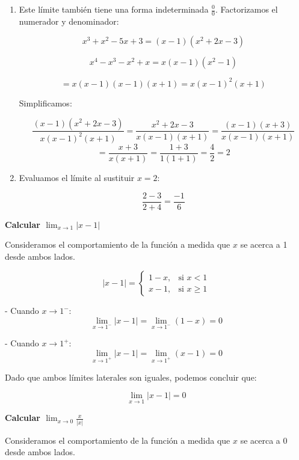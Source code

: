 \documentclass[answers]{exam} %
\begin{document}
\begin{questions}
\begin{solution}
\begin{enumerate}[label=\alph*.]
			\item Este límite también tiene una forma indeterminada \( \frac{0}{0} \). Factorizamos el numerador y denominador:

			      \[
				      x^3 + x^2 - 5x + 3 = (x-1)(x^2 + 2x - 3)
			      \]

			      \[
				      x^4 - x^3 - x^2 + x = x(x-1)(x^2 - 1)
			      \]

			      \[
				      = x(x-1)(x-1)(x+1) = x(x-1)^2(x+1)
			      \]

			      Simplificamos:

			      \[
				      \frac{(x-1)(x^2 + 2x - 3)}{x(x-1)^2(x+1)} = \frac{x^2 + 2x - 3}{x(x-1)(x+1)} = \frac{(x-1)(x+3)}{x(x-1)(x+1)}
			      \]
				  \[
					= \frac{x+3}{x(x+1)} = \frac{1+3}{1(1+1)} = \frac{4}{2} = 2 
				  \]
			\item Evaluamos el límite al sustituir \(x = 2\):

			      \[
				      \frac{2-3}{2+4} = \frac{-1}{6}
			      \]
		\end{enumerate}
		\vspace{1cm}
	\end{solution}


	\vspace{0.5cm}

	\question \large\textbf{Calcular $\displaystyle \lim_{x\to{1}} |x-1|$}
	\begin{solution}
		Consideramos el comportamiento de la función a medida que \( x \) se acerca a 1 desde ambos lados.

		\[
			|x-1| =
			\begin{cases}
				1 - x, & \text{si } x < 1   \\
				x - 1, & \text{si } x \ge 1
			\end{cases}
		\]

		- Cuando \( x \to 1^- \):
		\[
			\lim_{x \to 1^-} |x-1| = \lim_{x \to 1^-} (1 - x) = 0
		\]

		- Cuando \( x \to 1^+ \):
		\[
			\lim_{x \to 1^+} |x-1| = \lim_{x \to 1^+} (x - 1) = 0
		\]

		Dado que ambos límites laterales son iguales, podemos concluir que:

		\[
			\lim_{x \to 1} |x-1| = 0
		\]
	\end{solution}

	\question \large\textbf{Calcular $\displaystyle \lim_{x\to{0}} \frac{x}{|x|}$}
	\begin{solution}
		Consideramos el comportamiento de la función a medida que \( x \) se acerca a 0 desde ambos lados.


\end{solution}
\end{questions}
\end{document}
